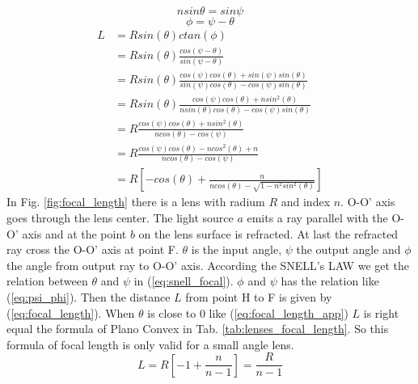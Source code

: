 \begin{equation}
nsin\theta=sin\psi
\label{eq:snell_focal}
\end{equation}
\begin{equation}
\phi=\psi-\theta
\label{eq:psi_phi}
\end{equation}
\begin{align}
L&=Rsin(\theta) ctan(\phi) \nonumber\\
&=Rsin(\theta)\frac{cos(\psi-\theta)}{ sin(\psi-\theta)} \nonumber\\
&= Rsin(\theta)\frac{cos(\psi)cos(\theta)+sin(\psi)sin(\theta)}{sin(\psi)cos(\theta)-cos(\psi)sin(\theta)} \nonumber\\
&= Rsin(\theta)\frac{cos(\psi)cos(\theta)+nsin^{2}(\theta)}{nsin(\theta)cos(\theta)-cos(\psi)sin(\theta)} \nonumber\\
&=R\frac{cos(\psi)cos(\theta)+nsin^{2}(\theta)}{ncos(\theta)-cos(\psi)} \nonumber\\
&=R\frac{cos(\psi)cos(\theta)-ncos^{2}(\theta)+n}{ncos(\theta)-cos(\psi)} \nonumber\\
&=R \left[-cos(\theta)+\frac{n}{ncos(\theta)-\sqrt{1-n^{2}sin^{2}(\theta)}} \right]
\label{eq:focal_length}
\end{align}
In Fig. \ref{fig:focal_length} there is a lens with radium $R$ and index $n$. O-O' axis goes through the lens center.  The light source $a$ emits a ray parallel with the O-O' axis and at the point $b$ on the lens surface is refracted. At last the refracted ray cross the O-O' axis at point F. $\theta$ is the input angle, $\psi$ the output angle and $\phi$ the angle from output ray to O-O' axis. According the SNELL's LAW we get the relation between $\theta$ and $\psi$ in (\ref{eq:snell_focal}). $\phi$ and $\psi$ has the relation like (\ref{eq:psi_phi}). Then the distance $L$ from point H to F is given by (\ref{eq:focal_length}). When $\theta$ is close to 0 like (\ref{eq:focal_length_app}) $L$ is right equal the formula of Plano Convex in Tab. \ref{tab:lenses_focal_length}. So this formula of focal length is only valid for a small angle lens. 
\begin{equation}
L=R\left[ -1+\frac{n}{n-1}\right]=\frac{R}{n-1}
\label{eq:focal_length_app}
\end{equation}


